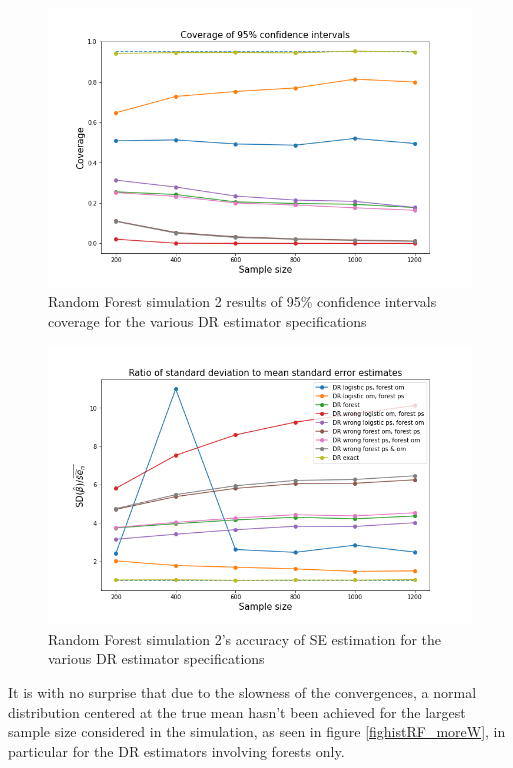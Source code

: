 \documentclass[12pt,twoside]{article}
\begin{document}
\begin{figure}[h!]
    \centering
    \includegraphics[width = 0.9\columnwidth]{figures/CIRF_moreW.png}
    \caption{Random Forest simulation 2 results of 95\% confidence intervals coverage for the various DR estimator specifications}
    \label{figCIRF_moreW}
\end{figure}

\begin{figure}[h!]
    \centering
    \includegraphics[width = 0.9\columnwidth]{figures/SERF_moreW.png}
    \caption{Random Forest simulation 2's accuracy of \citet{lunceford_davidian} SE estimation for the various DR estimator specifications}
    \label{figSERF_moreW}
\end{figure}

It is with no surprise that due to the slowness of the convergences, a normal distribution centered at the true mean hasn't been achieved for the largest sample size considered in the simulation, as seen in figure \ref{fighistRF_moreW}, in particular for the DR estimators involving forests only. \\
\end{document}
